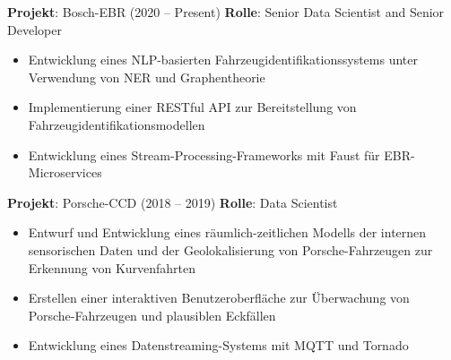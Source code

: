 \begin{experiences}
{    \textbf{Projekt}: Bosch-EBR (2020 -- Present)\newline
    \textbf{Rolle}: Senior Data Scientist and Senior Developer
    \begin{itemize}
      \item Entwicklung eines NLP-basierten Fahrzeugidentifikationssystems unter Verwendung von NER und Graphentheorie
      \item Implementierung einer RESTful API zur Bereitstellung von Fahrzeugidentifikationsmodellen
      \item Entwicklung eines Stream-Processing-Frameworks mit Faust für EBR-Microservices
    \end{itemize}
    \vspace{0.1cm}

    \textbf{Projekt}: Porsche-CCD (2018 -- 2019)\newline
    \textbf{Rolle}: Data Scientist
    \begin{itemize}
      \item Entwurf und Entwicklung eines räumlich-zeitlichen Modells der internen sensorischen Daten und der Geolokalisierung von Porsche-Fahrzeugen zur Erkennung von Kurvenfahrten
      \item Erstellen einer interaktiven Benutzeroberfläche zur Überwachung von Porsche-Fahrzeugen und plausiblen Eckfällen
      \item Entwicklung eines Datenstreaming-Systems mit MQTT und Tornado
    \end{itemize}
    \vspace{0.1cm}

}
\end{experiences}
